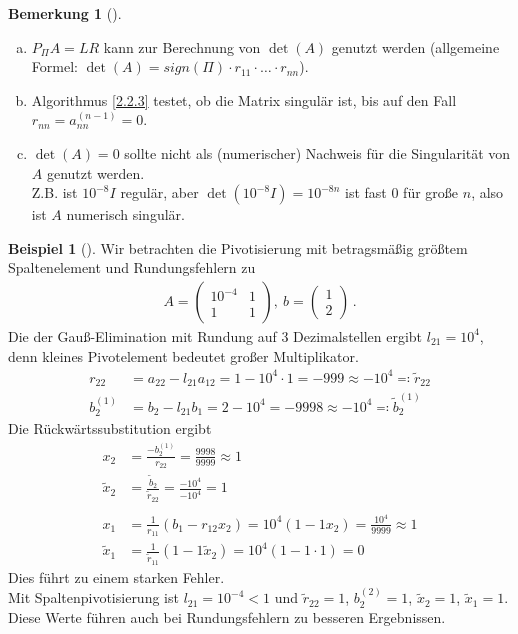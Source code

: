 \documentclass[ngerman,fontsize=11pt, paper=a4, parskip=half, titlepage=true, toc=bib]{scrbook}
\theoremstyle{definition}
\newtheorem{Bsp}[Def]{Beispiel}
\newtheorem{Bem}[Def]{Bemerkung}	%
\theoremstyle{plain}
\newcommand{\subsectione}[1]{\addtocounter{Def}{1}\subsection{#1}}
\newenvironment{Bspe}[1][]{ %
	\begin{Bsp}[#1]
	}
	{
	\end{Bsp}
	\addtocounter{subsection}{1}
}
\newenvironment{Beme}[1][]{ %
	\begin{Bem}[#1]
	}
	{
	\end{Bem}
	\addtocounter{subsection}{1}
}
\begin{document}
\begin{Beme}~
	\begin{enumerate}[a)]
		\item $P_\Pi A=LR$ kann zur Berechnung von $\det(A)$ genutzt werden
		(allgemeine Formel: $\det(A)=sign(\Pi)\cdot r_{11}\cdot \dots \cdot r_{nn}$).
		\item Algorithmus \ref{2.2.3}  testet, ob die Matrix singulär ist,
		bis auf den Fall $r_{nn}=a_{nn}^{(n-1)}=0$.
		\item $\det(A)=0$ sollte nicht als (numerischer) Nachweis für die
		Singularität von $A$ genutzt werden.\\
		Z.B. ist $10^{-8}I$ regulär, aber $\det(10^{-8}I) = 10^{-8n}$ ist fast 0
		für große $n$, also ist $A$ numerisch singulär.
	\end{enumerate}
\end{Beme}

\begin{Bspe}
	Wir betrachten die Pivotisierung mit betragsmäßig größtem Spaltenelement
	und Rundungsfehlern zu
	\begin{gather*}
	A=\begin{pmatrix}
	10^{-4} & 1 \\ 1 & 1
	\end{pmatrix}, ~
	b= \begin{pmatrix*}
	1 \\ 2
	\end{pmatrix*}\, .
	\end{gather*}
	Die der Gauß-Elimination mit Rundung auf 3 Dezimalstellen ergibt
	$l_{21}=10^4$, denn kleines Pivotelement bedeutet großer Multiplikator. \\
	\begin{align*}
	r_{22}&=a_{22}-l_{21}a_{12} = 1-10^4\cdot 1 = -999 \approx -10^4 \eqqcolon \widetilde{r}_{22}\\
	b_2^{(1)} & = b_2-l_{21}b_1 = 2-10^4 = -9998 \approx -10^4 \eqqcolon \widetilde{b}_2^{(1)} 
	\end{align*}
	Die Rückwärtssubstitution ergibt
	\begin{align*}
	x_2 &= \frac{-b_2^{(1)}}{r_{22}} = \frac{9998}{9999} \approx 1\\
	\widetilde{x}_	2 &= \frac{\widetilde{b}_2}{\widetilde{r}_{22}} = \frac{-10^4}{-10^4} = 1 \\\\
	x_1 &= \frac{1}{r_{11}}(b_1-r_{12}x_2)= 10^4 (1-1x_2) = \frac{10^4}{9999}\approx 1\\
	\widetilde{	x}_1 &= \frac{1}{\widetilde{r}_{11}}(1-1\widetilde{x}_2)= 10^4 (1-1\cdot 1) = 0 
	\end{align*}
	Dies führt zu einem starken Fehler.\\
	
	Mit Spaltenpivotisierung ist $l_{21}=10^{-4}<1$ und 
	$\widetilde{r}_{22}=1$, $b_2^{(2)} = 1$, $\widetilde{x}_2=1$, $\widetilde{x}_1=1$.\\
	Diese Werte führen auch bei Rundungsfehlern zu besseren Ergebnissen.
\end{Bspe}
\end{document}
